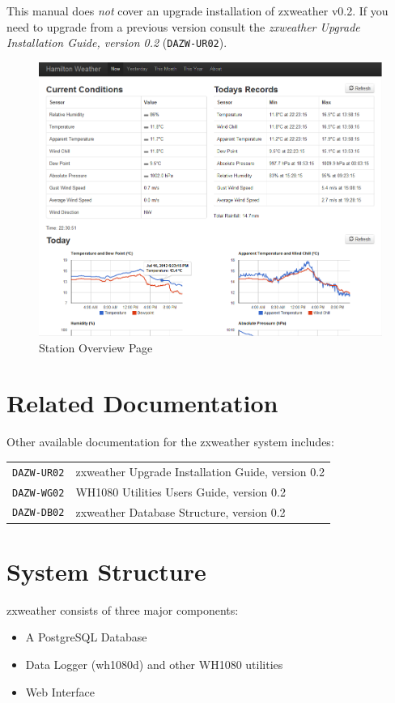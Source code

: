 \documentclass[a4paper,10pt,draft]{book}
\begin{document}
This manual does \emph{not} cover an upgrade installation of zxweather v0.2. If you need to upgrade from a previous version consult the \emph{zxweather Upgrade Installation Guide, version 0.2} (\verb|DAZW-UR02|).

\begin {figure}[!ht]
 \centering
 \includegraphics[scale=0.574]{images/stat_overview}
 \caption{Station Overview Page}
 \label{img_station_overview}
\end {figure}

\section{Related Documentation}
Other available documentation for the zxweather system includes:

\begin{tabular}{l l}
\verb|DAZW-UR02| & zxweather Upgrade Installation Guide, version 0.2\\
\verb|DAZW-WG02| & WH1080 Utilities Users Guide, version 0.2 \\
\verb|DAZW-DB02| & zxweather Database Structure, version 0.2 \\
\end{tabular}

\section{System Structure}
zxweather consists of three major components:
\begin{itemize}
\item A PostgreSQL Database
\item Data Logger (wh1080d) and other WH1080 utilities
\item Web Interface
\end{itemize}
\end{document}

